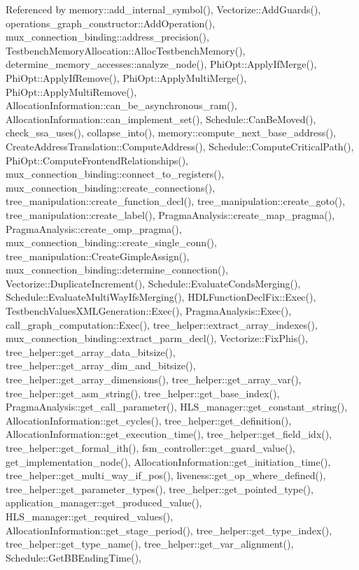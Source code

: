 Referenced by memory\+::add\+\_\+internal\+\_\+symbol(), Vectorize\+::\+Add\+Guards(), operations\+\_\+graph\+\_\+constructor\+::\+Add\+Operation(), mux\+\_\+connection\+\_\+binding\+::address\+\_\+precision(), Testbench\+Memory\+Allocation\+::\+Alloc\+Testbench\+Memory(), determine\+\_\+memory\+\_\+accesses\+::analyze\+\_\+node(), Phi\+Opt\+::\+Apply\+If\+Merge(), Phi\+Opt\+::\+Apply\+If\+Remove(), Phi\+Opt\+::\+Apply\+Multi\+Merge(), Phi\+Opt\+::\+Apply\+Multi\+Remove(), Allocation\+Information\+::can\+\_\+be\+\_\+asynchronous\+\_\+ram(), Allocation\+Information\+::can\+\_\+implement\+\_\+set(), Schedule\+::\+Can\+Be\+Moved(), check\+\_\+ssa\+\_\+uses(), collapse\+\_\+into(), memory\+::compute\+\_\+next\+\_\+base\+\_\+address(), Create\+Address\+Translation\+::\+Compute\+Address(), Schedule\+::\+Compute\+Critical\+Path(), Phi\+Opt\+::\+Compute\+Frontend\+Relationships(), mux\+\_\+connection\+\_\+binding\+::connect\+\_\+to\+\_\+registers(), mux\+\_\+connection\+\_\+binding\+::create\+\_\+connections(), tree\+\_\+manipulation\+::create\+\_\+function\+\_\+decl(), tree\+\_\+manipulation\+::create\+\_\+goto(), tree\+\_\+manipulation\+::create\+\_\+label(), Pragma\+Analysis\+::create\+\_\+map\+\_\+pragma(), Pragma\+Analysis\+::create\+\_\+omp\+\_\+pragma(), mux\+\_\+connection\+\_\+binding\+::create\+\_\+single\+\_\+conn(), tree\+\_\+manipulation\+::\+Create\+Gimple\+Assign(), mux\+\_\+connection\+\_\+binding\+::determine\+\_\+connection(), Vectorize\+::\+Duplicate\+Increment(), Schedule\+::\+Evaluate\+Conds\+Merging(), Schedule\+::\+Evaluate\+Multi\+Way\+Ifs\+Merging(), H\+D\+L\+Function\+Decl\+Fix\+::\+Exec(), Testbench\+Values\+X\+M\+L\+Generation\+::\+Exec(), Pragma\+Analysis\+::\+Exec(), call\+\_\+graph\+\_\+computation\+::\+Exec(), tree\+\_\+helper\+::extract\+\_\+array\+\_\+indexes(), mux\+\_\+connection\+\_\+binding\+::extract\+\_\+parm\+\_\+decl(), Vectorize\+::\+Fix\+Phis(), tree\+\_\+helper\+::get\+\_\+array\+\_\+data\+\_\+bitsize(), tree\+\_\+helper\+::get\+\_\+array\+\_\+dim\+\_\+and\+\_\+bitsize(), tree\+\_\+helper\+::get\+\_\+array\+\_\+dimensions(), tree\+\_\+helper\+::get\+\_\+array\+\_\+var(), tree\+\_\+helper\+::get\+\_\+asm\+\_\+string(), tree\+\_\+helper\+::get\+\_\+base\+\_\+index(), Pragma\+Analysis\+::get\+\_\+call\+\_\+parameter(), H\+L\+S\+\_\+manager\+::get\+\_\+constant\+\_\+string(), Allocation\+Information\+::get\+\_\+cycles(), tree\+\_\+helper\+::get\+\_\+definition(), Allocation\+Information\+::get\+\_\+execution\+\_\+time(), tree\+\_\+helper\+::get\+\_\+field\+\_\+idx(), tree\+\_\+helper\+::get\+\_\+formal\+\_\+ith(), fsm\+\_\+controller\+::get\+\_\+guard\+\_\+value(), get\+\_\+implementation\+\_\+node(), Allocation\+Information\+::get\+\_\+initiation\+\_\+time(), tree\+\_\+helper\+::get\+\_\+multi\+\_\+way\+\_\+if\+\_\+pos(), liveness\+::get\+\_\+op\+\_\+where\+\_\+defined(), tree\+\_\+helper\+::get\+\_\+parameter\+\_\+types(), tree\+\_\+helper\+::get\+\_\+pointed\+\_\+type(), application\+\_\+manager\+::get\+\_\+produced\+\_\+value(), H\+L\+S\+\_\+manager\+::get\+\_\+required\+\_\+values(), Allocation\+Information\+::get\+\_\+stage\+\_\+period(), tree\+\_\+helper\+::get\+\_\+type\+\_\+index(), tree\+\_\+helper\+::get\+\_\+type\+\_\+name(), tree\+\_\+helper\+::get\+\_\+var\+\_\+alignment(), Schedule\+::\+Get\+B\+B\+Ending\+Time(), 